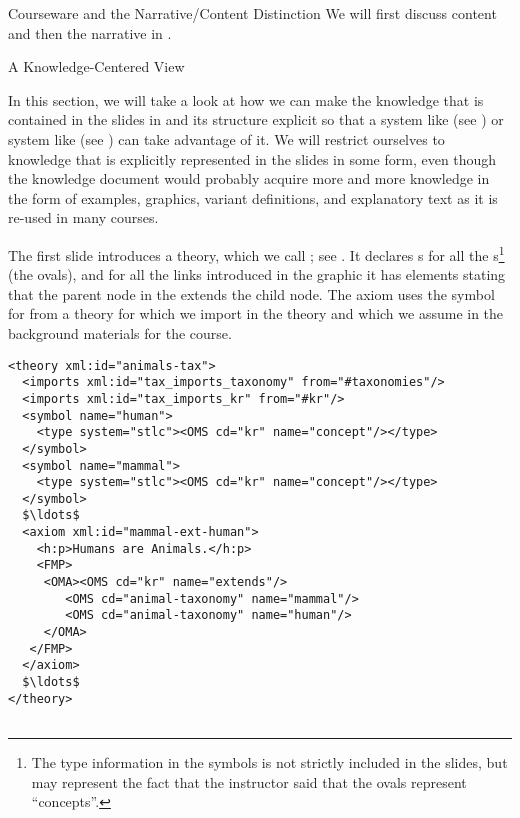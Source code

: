 \begin{omgroup}[id=courseware]{Courseware and the Narrative/Content Distinction}
We will first discuss content {\omdoc} and then the narrative {\omdoc} in
{}.

\begin{omgroup}[id=courseware.knowledge-centered]{A Knowledge-Centered View}

  In this section, we will take a look at how we can make the knowledge that is contained
  in the slides in {} and its structure explicit so that a
  {} system like {\mbase} (see {}) or
  {} system like {\activemath} (see
  {}) can take advantage of it. We will restrict ourselves to
  knowledge that is explicitly represented in the slides in some form, even though the
  knowledge document would probably acquire more and more knowledge in the form of
  examples, graphics, variant definitions, and explanatory text as it is re-used in many
  courses.

The first slide introduces a theory, which we call {}; see
{}.  It declares {s} for all the
{s}\footnote{The type information in the symbols is not strictly
  included in the slides, but may represent the fact that the instructor said that
  the ovals represent ``concepts''.}  (the ovals), and for all the links
introduced in the graphic it has {} elements stating that the
parent node in the {} extends the child node. The axiom uses the
symbol for {} from a theory {} for
{} which we import in the theory and which we
assume in the background materials for the course.

\begin{lstlisting}[label=lst:ann-tax,mathescape,
    caption={The {\omdoc} Representation for Slide 1 from {\myfigref{15-211}}},
    index={theory,axiom,symbol,h:p,FMP,OMA,OMS,private,data}]
<theory xml:id="animals-tax">
  <imports xml:id="tax_imports_taxonomy" from="#taxonomies"/>
  <imports xml:id="tax_imports_kr" from="#kr"/>
  <symbol name="human">
    <type system="stlc"><OMS cd="kr" name="concept"/></type>
  </symbol>
  <symbol name="mammal">
    <type system="stlc"><OMS cd="kr" name="concept"/></type>
  </symbol>
  $\ldots$
  <axiom xml:id="mammal-ext-human">
    <h:p>Humans are Animals.</h:p>
    <FMP>
     <OMA><OMS cd="kr" name="extends"/>
        <OMS cd="animal-taxonomy" name="mammal"/>
        <OMS cd="animal-taxonomy" name="human"/>
     </OMA>
   </FMP>
  </axiom>
  $\ldots$
</theory>


\end{lstlisting}
\end{omgroup}
\end{omgroup}
